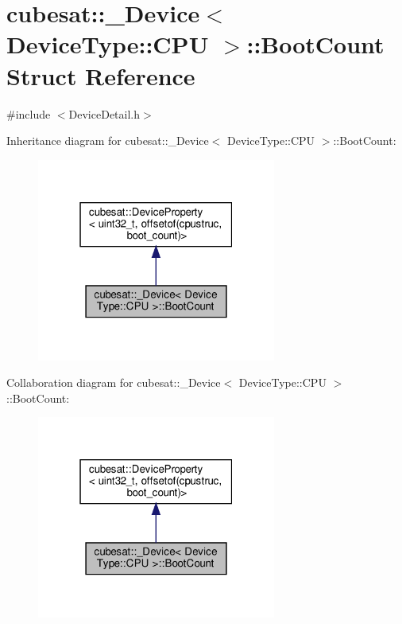 \hypertarget{structcubesat_1_1__Device_3_01DeviceType_1_1CPU_01_4_1_1BootCount}{}\section{cubesat\+:\+:\+\_\+\+Device$<$ Device\+Type\+:\+:C\+PU $>$\+:\+:Boot\+Count Struct Reference}
\label{structcubesat_1_1__Device_3_01DeviceType_1_1CPU_01_4_1_1BootCount}


{\ttfamily \#include $<$Device\+Detail.\+h$>$}



Inheritance diagram for cubesat\+:\+:\+\_\+\+Device$<$ Device\+Type\+:\+:C\+PU $>$\+:\+:Boot\+Count\+:\nopagebreak
\begin{figure}[H]
\begin{center}
\leavevmode
\includegraphics[width=223pt]{structcubesat_1_1__Device_3_01DeviceType_1_1CPU_01_4_1_1BootCount__inherit__graph}
\end{center}
\end{figure}


Collaboration diagram for cubesat\+:\+:\+\_\+\+Device$<$ Device\+Type\+:\+:C\+PU $>$\+:\+:Boot\+Count\+:\nopagebreak
\begin{figure}[H]
\begin{center}
\leavevmode
\includegraphics[width=223pt]{structcubesat_1_1__Device_3_01DeviceType_1_1CPU_01_4_1_1BootCount__coll__graph}
\end{center}
\end{figure}
